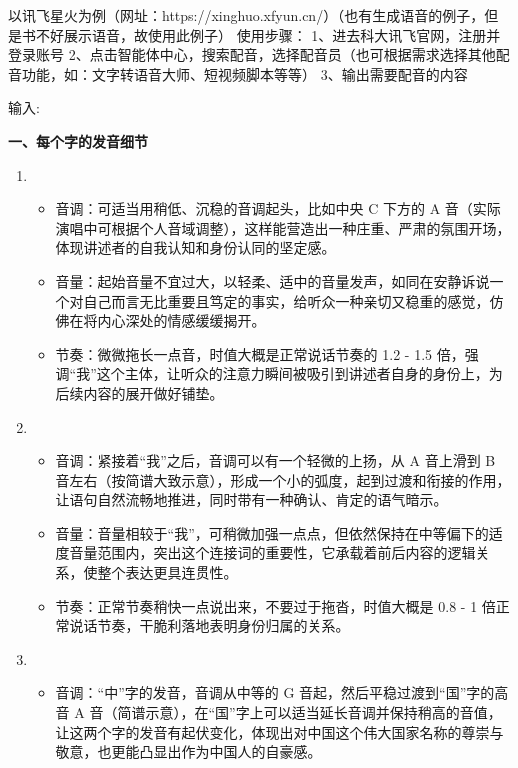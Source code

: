 以讯飞星火为例（网址：https://xinghuo.xfyun.cn/）（也有生成语音的例子，但是书不好展示语音，故使用此例子）
使用步骤：
1、进去科大讯飞官网，注册并登录账号
2、点击智能体中心，搜索配音，选择配音员（也可根据需求选择其他配音功能，如：文字转语音大师、短视频脚本等等）
3、输出需要配音的内容

输入:



\noindent\textbf{一、每个字的发音细节}
\begin{enumerate}
    \item {}
        \begin{itemize}
            \item 音调：可适当用稍低、沉稳的音调起头，比如中央 C 下方的 A 音（实际演唱中可根据个人音域调整），这样能营造出一种庄重、严肃的氛围开场，体现讲述者的自我认知和身份认同的坚定感。
            \item 音量：起始音量不宜过大，以轻柔、适中的音量发声，如同在安静诉说一个对自己而言无比重要且笃定的事实，给听众一种亲切又稳重的感觉，仿佛在将内心深处的情感缓缓揭开。
            \item 节奏：微微拖长一点音，时值大概是正常说话节奏的 1.2 - 1.5 倍，强调“我”这个主体，让听众的注意力瞬间被吸引到讲述者自身的身份上，为后续内容的展开做好铺垫。
        \end{itemize}
    \item {}
        \begin{itemize}
            \item 音调：紧接着“我”之后，音调可以有一个轻微的上扬，从 A 音上滑到 B 音左右（按简谱大致示意），形成一个小的弧度，起到过渡和衔接的作用，让语句自然流畅地推进，同时带有一种确认、肯定的语气暗示。
            \item 音量：音量相较于“我”，可稍微加强一点点，但依然保持在中等偏下的适度音量范围内，突出这个连接词的重要性，它承载着前后内容的逻辑关系，使整个表达更具连贯性。
            \item 节奏：正常节奏稍快一点说出来，不要过于拖沓，时值大概是 0.8 - 1 倍正常说话节奏，干脆利落地表明身份归属的关系。
        \end{itemize}
    \item {}
        \begin{itemize}
            \item 音调：“中”字的发音，音调从中等的 G 音起，然后平稳过渡到“国”字的高音 A 音（简谱示意），在“国”字上可以适当延长音调并保持稍高的音值，让这两个字的发音有起伏变化，体现出对中国这个伟大国家名称的尊崇与敬意，也更能凸显出作为中国人的自豪感。

\end{itemize}
\end{enumerate}
